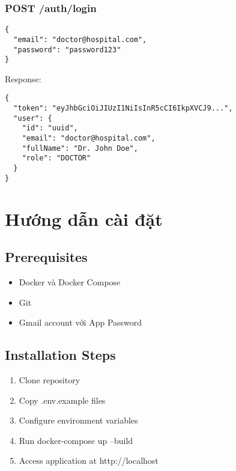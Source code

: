 \documentclass[12pt,a4paper]{report}
\begin{document}
\subsection{POST /auth/login}
\begin{lstlisting}[language=text]
{
  "email": "doctor@hospital.com",
  "password": "password123"
}
\end{lstlisting}

Response:
\begin{lstlisting}[language=text]
{
  "token": "eyJhbGciOiJIUzI1NiIsInR5cCI6IkpXVCJ9...",
  "user": {
    "id": "uuid",
    "email": "doctor@hospital.com",
    "fullName": "Dr. John Doe",
    "role": "DOCTOR"
  }
}
\end{lstlisting}

\chapter{Hướng dẫn cài đặt}
\section{Prerequisites}
\begin{itemize}
    \item Docker và Docker Compose
    \item Git
    \item Gmail account với App Password
\end{itemize}

\section{Installation Steps}
\begin{enumerate}
    \item Clone repository
    \item Copy .env.example files
    \item Configure environment variables
    \item Run docker-compose up --build
    \item Access application at http://localhost
\end{enumerate}
\end{document}
